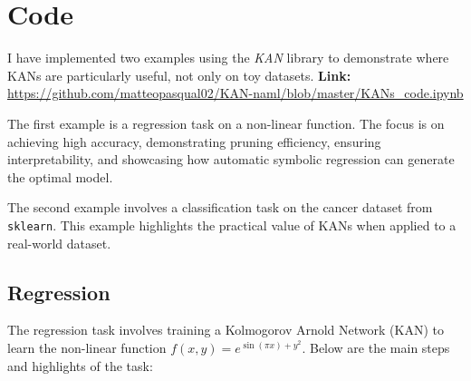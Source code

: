 \section{Code}

I have implemented two examples using the \textit{KAN} library to demonstrate where KANs are particularly useful, not only on toy datasets. 
\newline
\textbf{Link:} \url{https://github.com/matteopasqual02/KAN-naml/blob/master/KANs_code.ipynb}

The first example is a regression task on a non-linear function. The focus is on achieving high accuracy, demonstrating pruning efficiency, ensuring interpretability, and showcasing how automatic symbolic regression can generate the optimal model.

The second example involves a classification task on the cancer dataset from \texttt{sklearn}. This example highlights the practical value of KANs when applied to a real-world dataset.

\subsection{Regression}

The regression task involves training a Kolmogorov Arnold Network (KAN) to learn the non-linear function \( f(x, y) = e^{\sin(\pi x) + y^2} \). Below are the main steps and highlights of the task:

